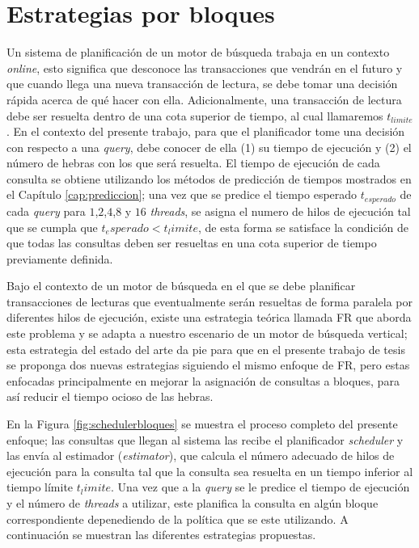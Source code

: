 \section{Estrategias por bloques}
\label{scheduling:bloques}
Un sistema de planificación de un motor de búsqueda trabaja en un contexto \textit{online}, esto significa que desconoce las transacciones que vendrán en el futuro y que cuando llega una nueva transacción de lectura, se debe tomar una decisión rápida acerca de qué hacer con ella. Adicionalmente, una transacción de lectura debe ser resuelta dentro de una cota superior de tiempo, al cual llamaremos $t_{limite}$. En el contexto del presente trabajo, para que el planificador tome una decisión con respecto a una \textit{query}, debe conocer de ella (1) su tiempo de ejecución y (2) el número de hebras con los que será resuelta. El tiempo de ejecución de cada consulta se obtiene utilizando los métodos de predicción de tiempos mostrados en el Capítulo \ref{cap:prediccion}; una vez que se predice el tiempo esperado $t_{esperado}$ de cada \textit{query} para $1$,$2$,$4$,$8$ y $16$ \textit{threads}, se asigna el numero de hilos de ejecución tal que se cumpla que $t_esperado < t_limite$, de esta forma se satisface la condición de que todas las consultas deben ser resueltas en una cota superior de tiempo previamente definida.

Bajo el contexto de un motor de búsqueda en el que se debe planificar transacciones de lecturas que eventualmente serán resueltas de forma paralela por diferentes hilos de ejecución, existe una estrategia teórica llamada FR que aborda este problema \citep{Ye:2007} y se adapta a nuestro escenario de un motor de búsqueda vertical; esta estrategia del estado del arte da pie para que en el presente trabajo de tesis se proponga dos nuevas estrategias siguiendo el mismo enfoque de FR, pero estas enfocadas principalmente en mejorar la asignación de consultas a bloques, para así reducir el tiempo ocioso de las hebras. 

En la Figura \ref{fig:schedulerbloques} se muestra el proceso completo del presente enfoque; las consultas que llegan al sistema las recibe el planificador \textit{scheduler} y las envía al estimador (\textit{estimator}), que calcula el número adecuado de hilos de ejecución para la consulta tal que la consulta sea resuelta en un tiempo inferior al tiempo límite $t_limite$. Una vez que a la \textit{query} se le predice el tiempo de ejecución y el número de \textit{threads} a utilizar, este planifica la consulta en algún bloque correspondiente depenediendo de la política que se este utilizando. A continuación se muestran las diferentes estrategias propuestas. 

